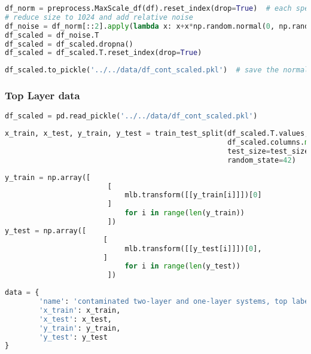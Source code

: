 \begin{lstlisting}[language=Python]
df_norm = preprocess.MaxScale_df(df).reset_index(drop=True)  # each spectrum is scaled to 1
# reduce size to 1024 and add relative noise
df_noise = df_norm[::2].apply(lambda x: x+x*np.random.normal(0, np.random.randint(1,3)*0.01 , len(x)))
df_scaled = df_noise.T
df_scaled = df_scaled.dropna()
df_scaled = df_scaled.T.reset_index(drop=True)
\end{lstlisting}

\begin{lstlisting}[language=Python]
df_scaled.to_pickle('../../data/df_cont_scaled.pkl')  # save the normalized, scaled df
\end{lstlisting}

\hypertarget{top-layer-data-1}{%
\subsubsection*{Top Layer data}\label{top-layer-data-1}}

\begin{lstlisting}[language=Python]
df_scaled = pd.read_pickle('../../data/df_cont_scaled.pkl')
\end{lstlisting}

\begin{lstlisting}[language=Python]
x_train, x_test, y_train, y_test = train_test_split(df_scaled.T.values,
                                                    df_scaled.columns.map(lambda x: x.split('_')[0]), # first part of the filename is the top label
                                                    test_size=test_size_ratio,
                                                    random_state=42)
\end{lstlisting}

\begin{lstlisting}[language=Python]
y_train = np.array([    
                        [
                            mlb.transform([[y_train[i]]])[0]
                        ] 
                            for i in range(len(y_train))
                        ])
y_test = np.array([ 
                       [
                            mlb.transform([[y_test[i]]])[0],
                       ] 
                            for i in range(len(y_test))
                        ])
\end{lstlisting}

\begin{lstlisting}[language=Python]
data = {
        'name': 'contaminated two-layer and one-layer systems, top labels',
        'x_train': x_train,
        'x_test': x_test,
        'y_train': y_train,
        'y_test': y_test
}
\end{lstlisting}

